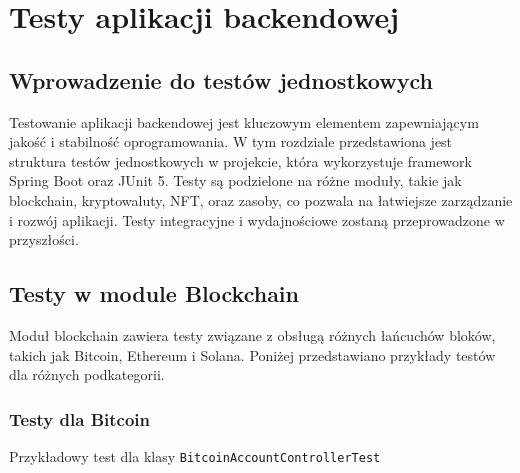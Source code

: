 \chapter{Testy aplikacji backendowej}

\section{Wprowadzenie do testów jednostkowych}

Testowanie aplikacji backendowej jest kluczowym elementem zapewniającym jakość i stabilność oprogramowania. W tym rozdziale przedstawiona jest struktura testów jednostkowych w projekcie, która wykorzystuje framework Spring Boot oraz JUnit 5. Testy są podzielone na różne moduły, takie jak blockchain, kryptowaluty, NFT, oraz zasoby, co pozwala na łatwiejsze zarządzanie i rozwój aplikacji. Testy integracyjne i wydajnościowe zostaną przeprowadzone w przyszłości.

\section{Testy w module Blockchain}

Moduł blockchain zawiera testy związane z obsługą różnych łańcuchów bloków, takich jak Bitcoin, Ethereum i Solana. Poniżej przedstawiano przykłady testów dla różnych podkategorii.

\subsection{Testy dla Bitcoin}

Przykładowy test dla klasy \texttt{BitcoinAccountControllerTest}

